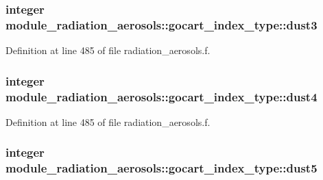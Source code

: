 \subsubsection[{\texorpdfstring{dust3}{dust3}}]{\setlength{\rightskip}{0pt plus 5cm}integer module\+\_\+radiation\+\_\+aerosols\+::gocart\+\_\+index\+\_\+type\+::dust3\hspace{0.3cm}{\ttfamily [private]}}\hypertarget{structmodule__radiation__aerosols_1_1gocart__index__type_a5d844db6dd6100b45808b5e19b468a84}{}\label{structmodule__radiation__aerosols_1_1gocart__index__type_a5d844db6dd6100b45808b5e19b468a84}


Definition at line 485 of file radiation\+\_\+aerosols.\+f.

\subsubsection[{\texorpdfstring{dust4}{dust4}}]{\setlength{\rightskip}{0pt plus 5cm}integer module\+\_\+radiation\+\_\+aerosols\+::gocart\+\_\+index\+\_\+type\+::dust4\hspace{0.3cm}{\ttfamily [private]}}\hypertarget{structmodule__radiation__aerosols_1_1gocart__index__type_a26a20aa03ac34523cc19644000d4924e}{}\label{structmodule__radiation__aerosols_1_1gocart__index__type_a26a20aa03ac34523cc19644000d4924e}


Definition at line 485 of file radiation\+\_\+aerosols.\+f.

\subsubsection[{\texorpdfstring{dust5}{dust5}}]{\setlength{\rightskip}{0pt plus 5cm}integer module\+\_\+radiation\+\_\+aerosols\+::gocart\+\_\+index\+\_\+type\+::dust5\hspace{0.3cm}{\ttfamily [private]}}\hypertarget{structmodule__radiation__aerosols_1_1gocart__index__type_a7d24acaa59ee8524dd8eca8f91f740c6}{}\label{structmodule__radiation__aerosols_1_1gocart__index__type_a7d24acaa59ee8524dd8eca8f91f740c6}


